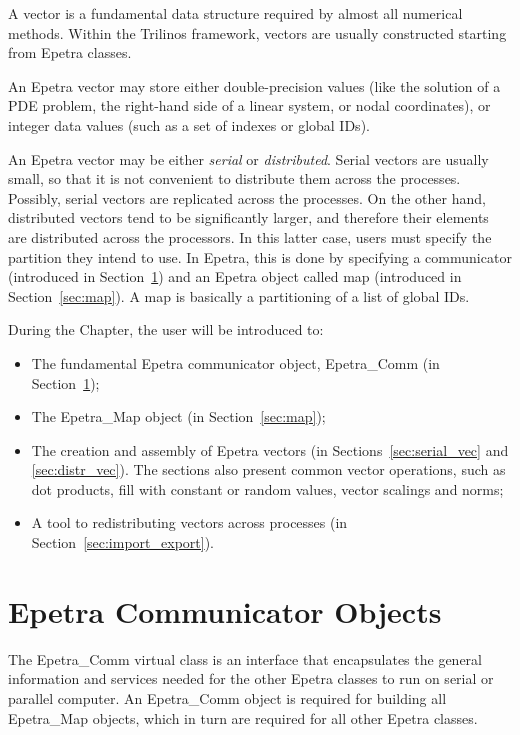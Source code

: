 \begin{introchapter}
A vector is a fundamental data structure required by almost all
numerical methods. Within the Trilinos framework, vectors are usually
constructed starting from Epetra classes.

An Epetra vector may store either double-precision values (like the
solution of a PDE problem, the right-hand side of a linear system, or
nodal coordinates), or integer data values (such as a set of indexes or
global IDs).

An Epetra vector may be either {\em serial} or {\em distributed}. Serial
vectors are usually small, so that it is not convenient to distribute
them across the processes. Possibly, serial vectors are replicated
across the processes. On the other hand, distributed vectors tend to be
significantly larger, and therefore their elements are distributed
across the processors. In this latter case, users must specify the
partition they intend to use.  In Epetra, this is done by specifying a
communicator (introduced in Section~\ref{sec:comm}) and an Epetra object
called map (introduced in Section~\ref{sec:map}). A map is basically a
partitioning of a list of global IDs.

\medskip

During the Chapter, the user will be introduced to:
\begin{itemize}
\item The fundamental Epetra communicator object, Epetra\_Comm (in
  Section~\ref{sec:comm});
\item The Epetra\_Map object (in Section~\ref{sec:map});
\item The creation and assembly of Epetra vectors (in
  Sections~\ref{sec:serial_vec} and \ref{sec:distr_vec}). The sections
  also present common vector operations, such as dot products, fill with
  constant or random values, vector scalings and norms;
\item A tool to redistributing vectors across processes (in
  Section~\ref{sec:import_export}).
\end{itemize}
\end{introchapter}


\section{Epetra Communicator Objects}
\label{sec:comm}

The Epetra\_Comm virtual class is an interface that encapsulates the
general information and services needed for the other Epetra classes to
run on serial or parallel computer. An Epetra\_Comm object is required
for building all Epetra\_Map objects, which in turn are required for all
other Epetra classes.

